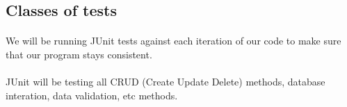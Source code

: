 \documentclass{article}
\begin{document}
\subsection{Classes of tests}
\paragraph{}
We will be running JUnit tests against each iteration of our code to make sure that our program stays consistent.

\paragraph{}
JUnit will be testing all CRUD (Create Update Delete) methods, database interation, data validation, etc methods.







\end{document}
